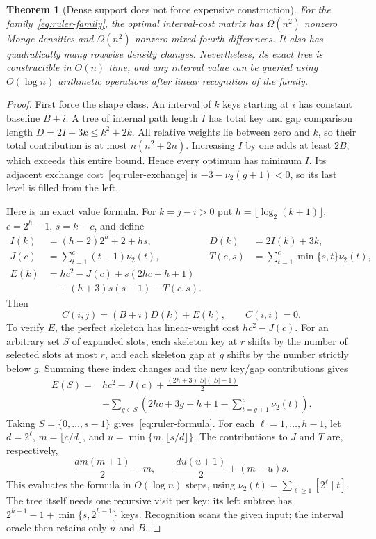 \documentclass[11pt]{article}
\newtheorem{theorem}{Theorem}
\begin{document}
\begin{theorem}[Dense support does not force expensive construction]\label{thm:ruler-dense}
For the family~\eqref{eq:ruler-family}, the optimal interval-cost matrix
has $\Omega(n^2)$ nonzero Monge densities and $\Omega(n^2)$ nonzero mixed
fourth differences. It also has quadratically many rowwise density changes.
Nevertheless, its exact tree is constructible in $O(n)$ time, and any
interval value can be queried using $O(\log n)$ arithmetic operations
after linear recognition of the family.
\end{theorem}
\begin{proof}
First force the shape class. An interval of $k$ keys starting at $i$ has
constant baseline $B+i$. A tree of internal path length $I$ has total key
and gap comparison length $D=2I+3k\le k^2+2k$. All relative weights lie
between zero and $k$, so their total contribution is at most
$n(n^2+2n)$. Increasing $I$ by one adds at least $2B$, which exceeds this
entire bound. Hence every optimum has minimum $I$. Its adjacent exchange
cost~\eqref{eq:ruler-exchange} is $-3-\nu_2(g+1)<0$, so its last level
is filled from the left.

Here is an exact value formula. For $k=j-i>0$ put
$h=\lfloor\log_2(k+1)\rfloor$, $c=2^h-1$, $s=k-c$, and define
\begin{align*}
 I(k)&=(h-2)2^h+2+hs, & D(k)&=2I(k)+3k,\\
 J(c)&=\sum_{t=1}^c(t-1)\nu_2(t), &
 T(c,s)&=\sum_{t=1}^c\min\{s,t\}\nu_2(t),\\
 E(k)&=hc^2-J(c)+s(2hc+h+1)\\
     &\hspace{1em}+(h+3)s(s-1)-T(c,s).
\end{align*}
Then
\begin{equation}\label{eq:ruler-formula}
 C(i,j)=(B+i)D(k)+E(k),\qquad C(i,i)=0.
\end{equation}
To verify $E$, the perfect skeleton has linear-weight cost $hc^2-J(c)$.
For an arbitrary set $S$ of expanded slots, each skeleton key at $r$
shifts by the number of selected slots at most $r$, and each skeleton gap
at $g$ shifts by the number strictly below $g$. Summing these index changes
and the new key/gap contributions gives
\begin{align*}
 E(S)={}&hc^2-J(c)+\frac{(2h+3)|S|(|S|-1)}2\\
 &+\sum_{g\in S}\left(2hc+3g+h+1-
                        \sum_{t=g+1}^c\nu_2(t)\right).
\end{align*}
Taking $S=\{0,\ldots,s-1\}$ gives~\eqref{eq:ruler-formula}.
For each $\ell=1,\ldots,h-1$, let $d=2^\ell$,
$m=\lfloor c/d\rfloor$, and $u=\min\{m,\lfloor s/d\rfloor\}$.
The contributions to $J$ and $T$ are, respectively,
\[
 \frac{dm(m+1)}2-m,\qquad
 \frac{du(u+1)}2+(m-u)s.
\]
This evaluates the formula in $O(\log n)$ steps, using
$\nu_2(t)=\sum_{\ell\ge1}[2^\ell\mid t]$. The tree itself needs one
recursive visit per key: its left subtree has
$2^{h-1}-1+\min\{s,2^{h-1}\}$ keys. Recognition scans the given input;
the interval oracle then retains only $n$ and $B$.


\end{proof}
\end{document}
